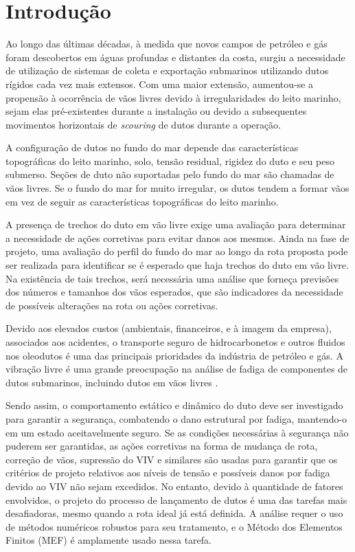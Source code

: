 \chapter{Introdução}


Ao longo das últimas décadas, à medida que novos campos de petróleo e gás foram descobertos em águas profundas e distantes da costa, surgiu a necessidade de utilização de sistemas de coleta e exportação submarinos utilizando dutos rígidos cada vez mais extensos.
Com uma maior extensão, aumentou-se a propensão à ocorrência de vãos livres devido à irregularidades do leito marinho, sejam elas pré-existentes durante a instalação ou devido a subsequentes movimentos horizontais de \textit{scouring} de dutos durante a operação.

A configuração de dutos no fundo do mar depende das características topográficas do leito marinho, solo, tensão residual, rigidez do duto e seu peso submerso.
Seções de duto não suportadas pelo fundo do mar são chamadas de vãos livres.
Se o fundo do mar for muito irregular, os dutos tendem a formar vãos em vez de seguir as características topográficas do leito marinho.

A presença de trechos do duto em vão livre exige uma avaliação para determinar a necessidade de ações corretivas para evitar danos aos mesmos. Ainda na fase de projeto, uma avaliação do perfil do fundo do mar ao longo da rota proposta pode ser realizada para identificar se é esperado que haja trechos do duto em vão livre.
Na existência de tais trechos, será necessária uma análise que forneça previsões dos números e tamanhos dos vãos esperados, que são indicadores da necessidade de possíveis alterações na rota ou ações corretivas.

Devido aos elevados custos (ambientais, financeiros, e à imagem da empresa), associados aos acidentes, o transporte seguro de hidrocarbonetos e outros fluidos nos oleodutos é uma das principais prioridades da indústria de petróleo e gás. A vibração livre é uma grande preocupação na análise de fadiga de componentes de dutos submarinos, incluindo dutos em vãos livres \cite{Gamino2013}.


Sendo assim, o comportamento estático e dinâmico do duto deve ser investigado para garantir a segurança, combatendo o dano estrutural por fadiga, mantendo-o em um estado aceitavelmente seguro.
Se as condições necessárias à segurança não puderem ser garantidas, as ações corretivas na forma de mudança de rota, correção de vãos, supressão do VIV e similares são usadas para garantir que os critérios de projeto relativos aos níveis de tensão e possíveis danos por fadiga devido ao VIV não sejam excedidos.
No entanto, devido à quantidade de fatores envolvidos, o projeto do processo de lançamento de dutos é uma das tarefas mais desafiadoras, mesmo quando a rota ideal já está definida.
A análise requer o uso de métodos numéricos robustos para seu tratamento, e o Método dos Elementos Finitos (MEF) é amplamente usado nessa tarefa.

